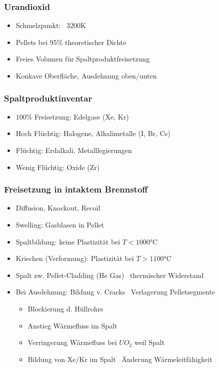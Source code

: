 \documentclass[12pt]{article}
\begin{document}
\subsubsection{Urandioxid}
\begin{itemize}
  \item Schmelzpunkt: ~3200K
  \item Pellets bei 95\% theoretischer Dichte
  \item Freies Volumen für Spaltproduktfreisetzung
  \item Konkave Oberfläche, Ausdehnung oben/unten
\end{itemize}

\subsubsection{Spaltproduktinventar}
\begin{itemize}
  \item 100\% Freisetzung: Edelgase (Xe, Kr)
  \item Hoch Flüchtig: Halogene, Alkalimetalle (I, Br, Cs)
  \item Flüchtig: Erdalkali, Metalllegierungen
  \item Wenig Flüchtig: Oxide (Zr)
\end{itemize}

\subsubsection{Freisetzung in intaktem Brennstoff}
\begin{itemize}
  \item Diffusion, Knockout, Recoil
  \item Swelling: Gasblasen in Pellet
  \item Spaltbildung: keine Plastizität bei \(T < 1000\)°C
  \item Kriechen (Verformung): Plastizität bei \(T > 1100\)°C
  \item Spalt zw. Pellet-Cladding (He Gas) \textrightarrow\ thermischer Widerstand
  \item Bei Ausdehnung: Bildung v. Cracks \textrightarrow\ Verlagerung Pelletsegmente
  \begin{itemize}
    \item Blockierung d. Hüllrohrs
    \item Anstieg Wärmefluss im Spalt
    \item Verringerung Wärmefluss bei \(UO_2\) weil Spalt
    \item Bildung von Xe/Kr im Spalt \textrightarrow\ Änderung Wärmeleitfähigkeit
  \end{itemize}
\end{itemize}
\end{document}
